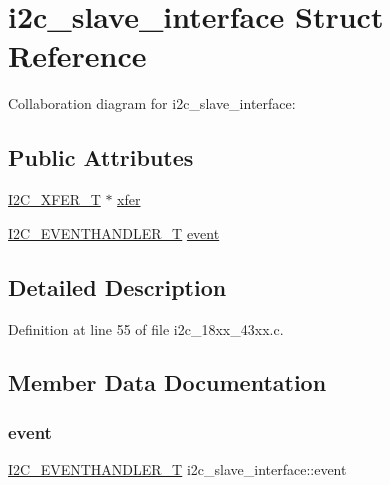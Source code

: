 \hypertarget{structi2c__slave__interface}{}\section{i2c\+\_\+slave\+\_\+interface Struct Reference}
\label{structi2c__slave__interface}


Collaboration diagram for i2c\+\_\+slave\+\_\+interface\+:
\subsection*{Public Attributes}
\begin{DoxyCompactItemize}
\item 
\hyperlink{struct_i2_c___x_f_e_r___t}{I2\+C\+\_\+\+X\+F\+E\+R\+\_\+T} $\ast$ \hyperlink{structi2c__slave__interface_a934caaab567fddcae9ebec6358047275}{xfer}
\item 
\hyperlink{group___i2_c__18_x_x__43_x_x_gaef152f4dc1487d90573810007489082e}{I2\+C\+\_\+\+E\+V\+E\+N\+T\+H\+A\+N\+D\+L\+E\+R\+\_\+T} \hyperlink{structi2c__slave__interface_a4b04024cbfed90df358b3546c1e9a2e0}{event}
\end{DoxyCompactItemize}


\subsection{Detailed Description}


Definition at line 55 of file i2c\+\_\+18xx\+\_\+43xx.\+c.



\subsection{Member Data Documentation}
\mbox{\label{structi2c__slave__interface_a4b04024cbfed90df358b3546c1e9a2e0}} 
\subsubsection{\texorpdfstring{event}{event}}
{\footnotesize\ttfamily \hyperlink{group___i2_c__18_x_x__43_x_x_gaef152f4dc1487d90573810007489082e}{I2\+C\+\_\+\+E\+V\+E\+N\+T\+H\+A\+N\+D\+L\+E\+R\+\_\+T} i2c\+\_\+slave\+\_\+interface\+::event}



